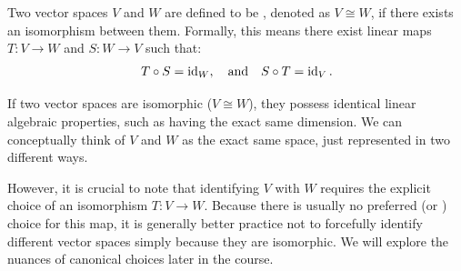 \begin{definition}
\label{def:isomorphic_spaces}
Two vector spaces $V$ and $W$ are defined to be , denoted as $V \cong W$, if there exists an isomorphism between them. Formally, this means there exist linear maps $T: V \to W$ and $S: W \to V$ such that:
\[
T \circ S = \operatorname{id}_W, \quad \text{and} \quad S \circ T = \operatorname{id}_V.
\]

\begin{center}
\end{center}

\end{definition}

\begin{remark}
\label{rem:significance_of_iso}
If two vector spaces are isomorphic ($V \cong W$), they possess identical linear algebraic properties, such as having the exact same dimension. We can conceptually think of $V$ and $W$ as the exact same space, just represented in two different ways. 

However, it is crucial to note that identifying $V$ with $W$ requires the explicit choice of an isomorphism $T: V \to W$. Because there is usually no preferred (or ) choice for this map, it is generally better practice not to forcefully identify different vector spaces simply because they are isomorphic. We will explore the nuances of canonical choices later in the course.
\end{remark}